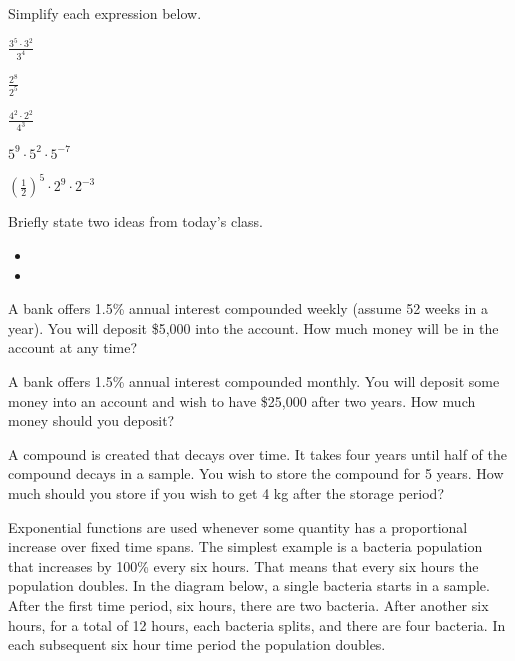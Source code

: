 \begin{problem}
  \vfill

  \clearpage

\item Simplify each expression below.
  \begin{subproblem}
  \item $\frac{3^5\cdot 3^2}{3^4}$
    \vfill
  \item $\frac{2^8}{2^5}$
    \vfill
  \item $\frac{4^2\cdot 2^2}{4^3}$
    \vfill
  \item $5^9\cdot 5^2\cdot 5^{-7}$
    \vfill
  \item $\left(\frac{1}{2}\right)^5 \cdot 2^9 \cdot 2^{-3}$
    \vfill
  \end{subproblem}

\end{problem}

\postClass

\begin{problem}
\item Briefly state two ideas from today's class.
  \begin{itemize}
  \item 
  \item 
  \end{itemize}
\item A bank offers 1.5\% annual interest compounded weekly (assume 52
  weeks in a year). You will deposit \$5,000 into the account. How
  much money will be in the account at any time?
\item A bank offers 1.5\% annual interest compounded monthly. You will
  deposit some money into an account and wish to have \$25,000 after
  two years. How much money should you deposit?
\item A compound is created that decays over time. It takes four years
  until half of the compound decays in a sample. You wish to store the
  compound for 5 years. How much should you store if you wish to get 4
  kg after the storage period?
\end{problem}



Exponential functions are used whenever some quantity has a
proportional increase over fixed time spans. The simplest example is a
bacteria population that increases by 100\% every six hours. That
means that every six hours the population doubles. In the diagram
below, a single bacteria starts in a sample. After the first time
period, six hours, there are two bacteria. After another six hours,
for a total of 12 hours, each bacteria splits, and there are four
bacteria. In each subsequent six hour time period the population
doubles. 

